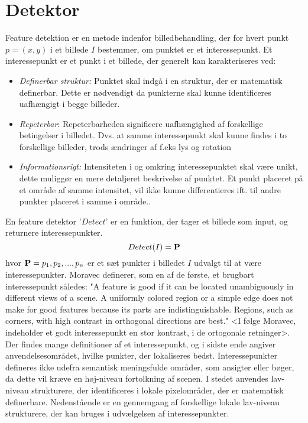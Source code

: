 \section{Detektor}\label{sec:detect}
Feature detektion er en metode indenfor billedbehandling, der for hvert punkt $p = (x,y)$ i et billede $I$ bestemmer, om punktet er et interessepunkt. Et interessepunkt er et punkt i et billede, der generelt kan karakteriseres ved\cite{pointsurvey}:
\begin{itemize}
\item{\textit{Definerbar struktur:} Punktet skal indgå i en struktur, der er matematisk definerbar. Dette er nødvendigt da punkterne skal kunne identificeres uafhængigt i begge billeder.}
\item{\emph{Repeterbar}: Repeterbarheden significere uafhængighed af forskellige betingelser i billedet. Dvs. at samme interessepunkt skal kunne findes i to forskellige billeder, trods ændringer af f.eks lys og rotation}
\item{\emph{Informationsrigt:}
Intensiteten i og omkring interessepunktet skal være unikt, dette muliggør en mere detaljeret beskrivelse af punktet. Et punkt placeret på et område af samme intensitet, vil ikke kunne differentieres ift. til andre punkter placeret i samme i område..}
\end{itemize}
En feature detektor '$Detect$' er en funktion, der tager et billede som input, og returnere interessepunkter.
\begin{equation}
Detect(I)= \bold{P}
\label{detect}
\end{equation}
hvor $\bold{P} = {p_1, p_2,..., p_n}$ er et sæt punkter i billedet $I$ udvalgt til at være interessepunkter.
Moravec \cite{moravec} definerer, som en af de første, et brugbart interessepunkt således: "A
feature is good if it can be located unambiguously in different views of a scene. A
uniformly colored region or a simple edge does not make for good features because
its parts are indistinguishable. Regions, such as corners, with high contrast in
orthogonal directions are best." <I følge Moravec, indeholder et godt interessepunkt en stor kontrast, i de ortogonale retninger>. Der findes mange definitioner af et interessepunkt, og i sidste ende angiver anvendelsesområdet, hvilke punkter, der lokaliseres bedst.
Interessepunkter defineres ikke udefra semantisk meningsfulde områder, som ansigter eller bøger, da dette vil kræve en høj-niveau fortolkning af scenen. I stedet anvendes lav-niveau strukturere, der identificeres i lokale pixelområder, der er matematisk definerbare. Nedenstående er en gennemgang af forskellige lokale lav-niveau strukturere, der kan bruges i udvælgelsen af interessepunkter.


\raggedbottom